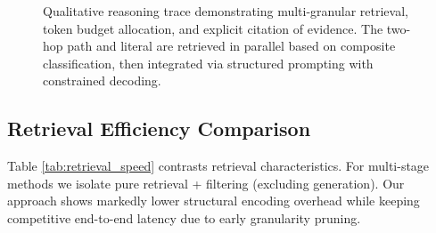 \documentclass[conference]{IEEEtran}
\begin{document}
\begin{figure}[t]
\centering
{}
\caption{Qualitative reasoning trace demonstrating multi-granular retrieval, token budget allocation, and explicit citation of evidence. The two-hop path and literal are retrieved in parallel based on composite classification, then integrated via structured prompting with constrained decoding.}
\label{fig:qualitative}
\end{figure}

\subsection{Retrieval Efficiency Comparison}
Table \ref{tab:retrieval_speed} contrasts retrieval characteristics. For multi-stage methods we isolate pure retrieval + filtering (excluding generation). Our approach shows markedly lower structural encoding overhead while keeping competitive end-to-end latency due to early granularity pruning.
\end{document}
